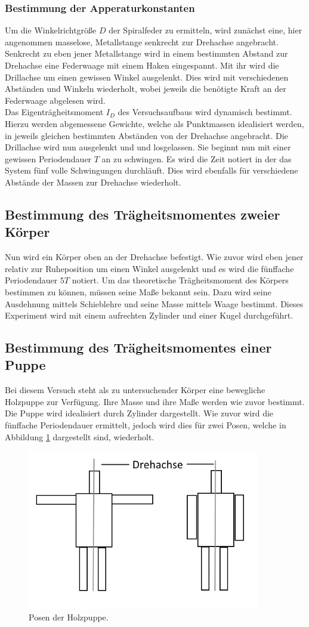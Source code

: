 \subsubsection{Bestimmung der Apperaturkonstanten}
Um die Winkelrichtgröße $D$ der Spiralfeder zu ermitteln, wird zunächst eine, hier angenommen masselose, Metallstange senkrecht zur Drehachse angebracht.
Senkrecht zu eben jener Metallstange wird in einem bestimmten Abstand zur Drehachse eine Federwaage mit einem Haken eingespannt.
Mit ihr wird die Drillachse um einen gewissen Winkel ausgelenkt.
Dies wird mit verschiedenen Abständen und Winkeln wiederholt, wobei jeweils die benötigte Kraft an der Federwaage abgelesen wird.\\
Das Eigenträgheitsmoment $I_{D}$ des Versuchsaufbaus wird dynamisch bestimmt.
Hierzu werden abgemessene Gewichte, welche als Punktmassen idealisiert werden, in jeweils gleichen bestimmten Abständen von der Drehachse angebracht.
Die Drillachse wird nun ausgelenkt und und losgelassen.
Sie beginnt nun mit einer gewissen Periodendauer $T$ an zu schwingen.
Es wird die Zeit notiert in der das System fünf volle Schwingungen durchläuft.
Dies wird ebenfalls für verschiedene Abstände der Massen zur Drehachse wiederholt.

\subsection{Bestimmung des Trägheitsmomentes zweier Körper}
Nun wird ein Körper oben an der Drehachse befestigt.
Wie zuvor wird eben jener relativ zur Ruheposition um einen Winkel ausgelenkt und es wird die fünffache Periodendauer $5T$ notiert.
Um das theoretische Trägheitsmoment des Körpers bestimmen zu können, müssen seine Maße bekannt sein.
Dazu wird seine Ausdehnung mittels Schieblehre und seine Masse mittels Waage bestimmt.
Dieses Experiment wird mit einem aufrechten Zylinder und einer Kugel durchgeführt.

\subsection{Bestimmung des Trägheitsmomentes einer Puppe}
Bei diesem Versuch steht als zu untersuchender Körper eine bewegliche Holzpuppe zur Verfügung.
Ihre Masse und ihre Maße werden wie zuvor bestimmt.
Die Puppe wird idealisiert durch Zylinder dargestellt.
Wie zuvor wird die fünffache Periodendauer ermittelt, jedoch wird dies für zwei Posen, welche in Abbildung \ref{df:2} dargestellt sind, wiederholt.

\begin{figure}
  \centering
  \includegraphics[height=7cm]{Posen.png}
  \caption{Posen der Holzpuppe.}
  \label{df:2}
\end{figure}

